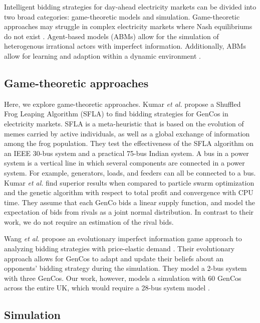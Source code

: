 \documentclass[conference]{IEEEtran}
\begin{document}
Intelligent bidding strategies for day-ahead electricity markets can be divided into two broad categories: game-theoretic models and simulation. Game-theoretic approaches may struggle in complex electricity markets where Nash equilibriums do not exist \cite{Wang2011}. Agent-based models (ABMs) allow for the simulation of heterogenous irrational actors with imperfect information. Additionally, ABMs allow for learning and adaption within a dynamic environment \cite{EsmaeiliAliabadi2017}.

\subsection{Game-theoretic approaches}

Here, we explore game-theoretic approaches. Kumar \textit{et al.} propose a Shuffled Frog Leaping Algorithm (SFLA) \cite{VijayaKumar2014} to find bidding strategies for GenCos in electricity markets. SFLA is a meta-heuristic that is based on the evolution of memes carried by active individuals, as well as a global exchange of information among the frog population. They test the effectiveness of the SFLA algorithm on an IEEE 30-bus system and a practical 75-bus Indian system. A bus in a power system is a vertical line in which several components are connected in a power system. For example, generators, loads, and feeders can all be connected to a bus. Kumar \textit{et al.} find superior results when compared to particle swarm optimization and the genetic algorithm with respect to total profit and convergence with CPU time. They assume that each GenCo bids a linear supply function, and model the expectation of bids from rivals as a joint normal distribution. In contrast to their work, we do not require an estimation of the rival bids.

Wang \textit{et al.} propose an evolutionary imperfect information game approach to analyzing bidding strategies with price-elastic demand \cite{Wang2011}. Their evolutionary approach allows for GenCos to adapt and update their beliefs about an opponents' bidding strategy during the simulation. They model a 2-bus system with three GenCos. Our work, however, models a simulation with 60 GenCos across the entire UK, which would require a 28-bus system model \cite{Bell2010}. 


\subsection{Simulation}
\end{document}
